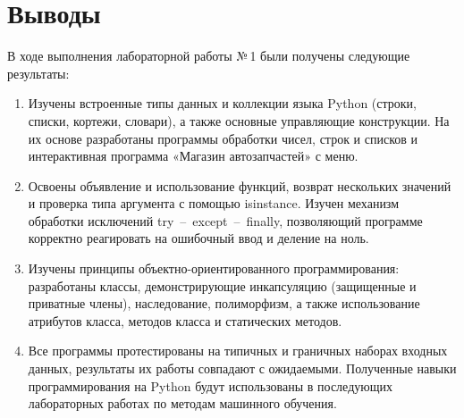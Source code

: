 \documentclass[14pt,a4paper]{extarticle}
\newcommand{\stpcodefont}{\fontencoding{T1}\fontfamily{pcr}\selectfont}
\renewcommand{\texttt}[1]{{\stpcodefont #1}}
\begin{document}
\section{Выводы}
В ходе выполнения лабораторной работы №\,1 были получены следующие результаты:
\begin{enumerate}
  \item Изучены встроенные типы данных и коллекции языка Python (строки, списки, кортежи, словари), а также основные управляющие конструкции. На их основе разработаны программы обработки чисел, строк и списков и интерактивная программа «Магазин автозапчастей» с меню.
  \item Освоены объявление и использование функций, возврат нескольких значений и проверка типа аргумента с помощью \texttt{isinstance}. Изучен механизм обработки исключений \texttt{try}~--~\texttt{except}~--~\texttt{finally}, позволяющий программе корректно реагировать на ошибочный ввод и деление на ноль.
  \item Изучены принципы объектно-ориентированного программирования: разработаны классы, демонстрирующие инкапсуляцию (защищенные и приватные члены), наследование, полиморфизм, а также использование атрибутов класса, методов класса и статических методов.
  \item Все программы протестированы на типичных и граничных наборах входных данных, результаты их работы совпадают с ожидаемыми. Полученные навыки программирования на Python будут использованы в последующих лабораторных работах по методам машинного обучения.
\end{enumerate}
\end{document}
